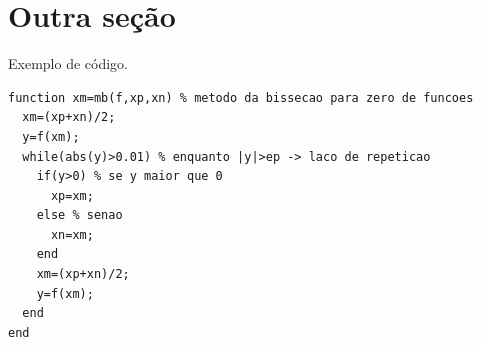\section{Outra seção}
\label{sec:cod}

Exemplo de código.
 \begin{verbatim}
function xm=mb(f,xp,xn) % metodo da bissecao para zero de funcoes
  xm=(xp+xn)/2;
  y=f(xm);
  while(abs(y)>0.01) % enquanto |y|>ep -> laco de repeticao 
    if(y>0) % se y maior que 0
      xp=xm;
    else % senao
      xn=xm;
    end
    xm=(xp+xn)/2;
    y=f(xm);
  end
end
\end{verbatim}
